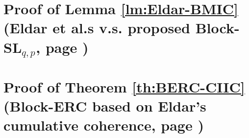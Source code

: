 \section{Proof of Lemma \ref{lm:Eldar-BMIC} (Eldar et al.\textquotesingle s v.s. proposed Block-SL$_{q,p}$, page \pageref{lm:Eldar-BMIC})} %
\label{prf:Eldar-BMIC} 

\newpage
\section{Proof of Theorem \ref{th:BERC-CIIC} (Block-ERC based on Eldar's cumulative coherence, page \pageref{th:BERC-CIIC})}
\label{prf:BERC-CIIC}
